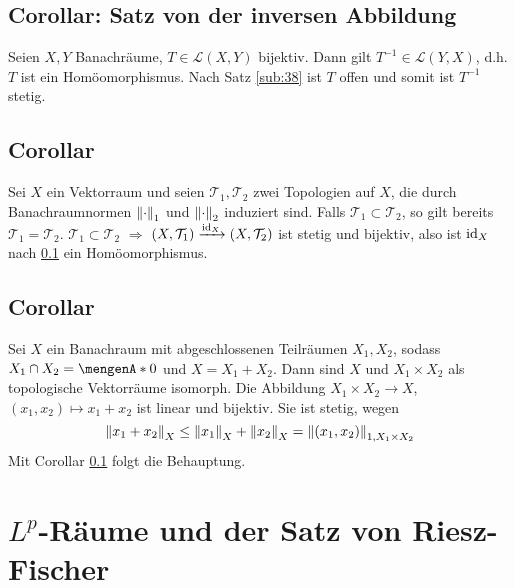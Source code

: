 \subsection{Corollar: Satz von der inversen Abbildung} %
\label{sub:39}
Seien $X,Y$ Banachräume, $T \in \mathcal{L}(X,Y)$ bijektiv. Dann gilt $T ^{-1} \in \mathcal{L}(Y,X)$, d.h. $T$ ist ein Homöomorphismus.
Nach Satz \ref{sub:38} ist $T$ offen und somit ist $T ^{-1}$ stetig. \bewende

\subsection{Corollar} %
\label{sub:310}
Sei $X$ ein Vektorraum und seien $\mathcal{T}_1, \mathcal{T}_2$ zwei Topologien auf $X$, die durch Banachraumnormen $\norm[1]{\cdot }$ und $\norm[2]{\cdot}$ induziert sind.
Falls $\mathcal{T}_1 \subset \mathcal{T}_2$, so gilt bereits $\mathcal{T}_1 = \mathcal{T}_2$.
$\mathcal{T}_1 \subset \mathcal{T}_2$ $\Rightarrow $ $(X,\mathcal{T}_1) \xrightarrow{\operatorname{id}_X} (X,\mathcal{T}_2)$ ist stetig und bijektiv, also ist $\operatorname{id}_X$ nach 
\ref{sub:39} ein Homöomorphismus. \bewende

\subsection{Corollar} %
\label{sub:311}
Sei $X$ ein Banachraum mit abgeschlossenen Teilräumen $X_1,X_2$, sodass $X_1 \cap X_2 = \set{0}$ und $X= X_1 + X_2$. Dann sind $X$ und $X_1 \times X_2$ als topologische
Vektorräume isomorph.
Die Abbildung $X_1 \times X_2 \to X$, $(x_1,x_2) \mapsto x_1 + x_2$ ist linear und bijektiv. Sie ist stetig, wegen 
\[
	\norm[X]{x_1 + x_2} \le \norm[X]{x_1} + \norm[X]{x_2} = \norm[1,X_1 \times X_2]{(x_1,x_2)} 
\]
Mit Corollar \ref{sub:39} folgt die Behauptung. \bewende
\newpage

\section{$L^p$-Räume und der Satz von Riesz-Fischer} %
\label{sec:4}

